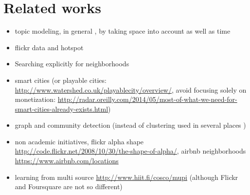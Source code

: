 \chapter{Related works}
\label{chap:related}

\begin{itemize}

\item topic modeling, in general \autocite{topicModel}, by taking space into
account \autocite{GeoTopicYin11, GeoTopicKurashima2013, nestedChinese13,%
NonGaussianTopicKling14} as well as time \autocite{GeoScope, TwitterBurst13}


\item flickr data and hotspot \autocite{TagHotspot12, Hotspots12}

\item Searching explicitly for neighborhoods
\autocite{Rattenbury2009, Livehoods12, SocioMap12, Hoodsquare13}

\item smart cities \autocite{HelsinkiSCC11, Eunoia13, SmartCities13} (or
playable cities: \url{http://www.watershed.co.uk/playablecity/overview/},
\ie{} avoid focusing solely on monetization:
\url{http://radar.oreilly.com/2014/05/most-of-what-we-need-for-smart-cities-already-exists.html})


\item graph and community detection (instead of clustering used in several
places \autocite{PositinalCluster14})

\item non academic initiatives, flickr alpha shape
\url{http://code.flickr.net/2008/10/30/the-shape-of-alpha/}, airbnb
neighborhoods \url{https://www.airbnb.com/locations}

\item learning from multi source \url{http://www.hiit.fi/cosco/mupi} (although
Flickr and Foursquare are not so different)

\end{itemize}
